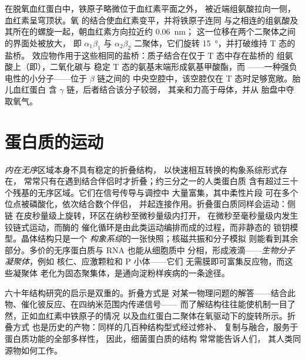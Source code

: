 \begin{proposition}[开关的机制]\label{prop:b3:structural-biology:mechanism}
在脱氧血红蛋白中，铁原子略微位于血红素平面之外，
被近端组氨酸拉向一侧，血红素呈穹顶状。氧
的结合使血红素变平，并将铁原子连同
与之相连的组氨酸及其所在的螺旋一起，朝血红素方向拉近约 \qty{0.06}{nm}；
这一位移在两个二聚体之间的界面处被放大，
即 $\alpha_{1}\beta_{1}$ 与 $\alpha_{2}\beta_{2}$ 二聚体，它们旋转
\qty{15}{\degree}，并打破维持 T 态的盐桥。
效应物作用于这些相同的盐桥：质子结合在仅于 T 态中存在盐桥的
组氨酸上（即），二氧化碳与
稳定 T 态的氨基末端形成氨基甲酸酯，而
——一种强负电性的小分子——位于 $\beta$ 链之间的
中央空腔中，该空腔仅在 T 态时足够宽敞。胎儿血红蛋白
含 $\gamma$ 链，后者结合该分子较弱，
其亲和力高于母体，并从
胎盘中夺取氧气。
\end{proposition}

\section{蛋白质的运动}

\begin{definition}[无序与动力学]\label{def:b3:structural-biology:disorder}
\emph{内在无序}区域本身不具有稳定的折叠结构，
以快速相互转换的构象系综形式存在，
常常只有在遇到结合伴侣时才折叠；约三分之一的人类蛋白质
含有超过三十个残基的无序区域。它们在信号传导与调控中
大量富集，其中柔性片段
可在多个位点被磷酸化，依次结合数个伴侣，
并起连接作用。折叠蛋白质同样会运动：侧链
在皮秒量级上旋转，环区在纳秒至微秒量级内打开，
在微秒至毫秒量级内发生铰链式运动，而酶的
催化循环是由此类运动编排而成的过程，而非静态的
锁钥模型。晶体结构只是一个
\emph{构象系综}的一张快照；核磁共振和分子模拟
则能看到其余部分。多价的无序蛋白质与 RNA 也能从细胞质中
分相，形成液滴——\emph{生物分子凝聚体}，例如
核仁、应激颗粒和 P 小体——它们
无需膜即可富集反应物，而这些凝聚体
老化为固态聚集体，是通向淀粉样疾病的一条途径。
\end{definition}

\begin{remark}[结构与功能]\label{rem:b3:structural-biology:sf}
六十年结构研究的启示是双重的。折叠方式是
对某一物理问题的解答——结合此物、催化彼反应、在四纳米范围内传递信号——
而了解结构往往能使机制一目了然，正如血红素中铁原子的情况
以及血红蛋白二聚体在氧驱动下的旋转所示。折叠方式
也是历史的产物：同样的几百种结构型式经过修补、
复制与融合，服务于蛋白质功能的全部多样性，
因此，细菌蛋白质的结构
常常能告诉人们，
其人类同源物如何工作。
\end{remark}

